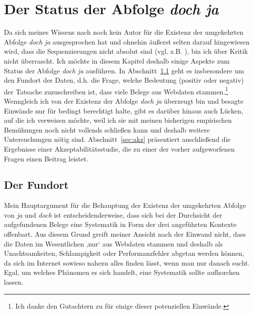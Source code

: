 \section{Der Status der Abfolge \textit{doch ja}}
\label{sec:status}
Da sich meines Wissens nach noch kein Autor für die Existenz der umgekehrten Abfolge \textit{doch ja} ausgesprochen hat und ohnehin äußerst selten darauf hingewie\-sen wird, dass die Sequenzierungen nicht absolut sind (vgl. z.B. \citealt[289]{Thurmair1989}), bin ich über Kritik nicht überrascht. Ich möchte in diesem Kapitel deshalb einige Aspekte zum Status der Abfolge \textit{doch ja} ausführen. In Abschnitt~\ref{sec:ort} geht es insbesondere um den Fundort der Daten, d.h. die Frage, welche Bedeutung (positiv oder negativ) der Tatsache zuzuschreiben ist, dass viele Belege aus Webdaten stammen.\footnote{Ich danke den Gutachtern zu \citet{Mueller2017b} für einige dieser potenziellen Einwände.} Wenngleich ich von der Existenz der Abfolge \textit{doch ja} überzeugt bin und besagte Einwände nur für bedingt berechtigt halte, gibt es darüber hi\-naus auch Lücken, auf die ich verweisen möchte, weil ich sie mit meinen bisherigen empirischen Bemühungen noch nicht vollends schließen kann und deshalb wei\-tere Untersuchungen nötig sind. Abschnitt~\ref{sec:akz} präsentiert anschließend die Ergebnisse einer Akzeptabilitätsstudie, die zu einer der vorher aufgeworfenen Fragen einen Beitrag leistet.

\subsection{Der Fundort}
\label{sec:ort}
Mein Hauptargument für die Behauptung der Existenz der umgekehrten Abfolge von \textit{ja} und \textit{doch} ist entscheidenderweise, dass sich bei der Durchsicht der aufgefundenen Belege eine Systematik in Form der drei angeführten Kontexte offenbart. Aus diesem Grund greift meiner Ansicht nach der Einwand nicht, dass die Daten im Wesentlichen ‚nur‘ aus Webdaten stammen und deshalb als Unachtsamkeiten, Schlampigkeit oder Performanzfehler abgetan werden können, da sich im Internet sowieso nahezu alles finden lässt, wenn man nur danach sucht. Egal, um welches Phänomen es sich handelt, eine Systematik sollte aufhorchen lassen.

